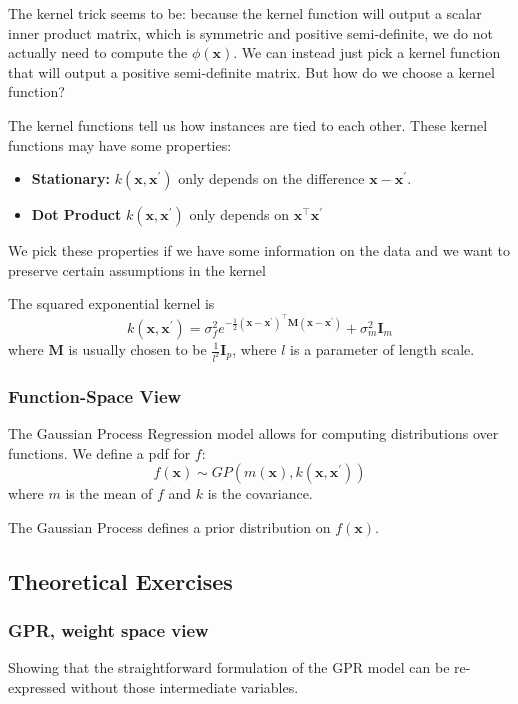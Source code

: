 \documentclass[11pt]{article}
\begin{document}
The kernel trick seems to be: because the kernel function will output a scalar inner product matrix, which is symmetric and positive semi-definite,
we do not actually need to compute the $\phi(\textbf{x})$.
We can instead just pick a kernel function that will output a positive semi-definite matrix.
But how do we choose a kernel function?

The kernel functions tell us how instances are tied to each other.
These kernel functions may have some properties:
\begin{itemize}
  \item \textbf{Stationary:} $k(\textbf{x}, \textbf{x}^\prime)$ only depends on the difference $\textbf{x} - \textbf{x}^\prime$.
  \item \textbf{Dot Product} $k(\textbf{x}, \textbf{x}^\prime)$ only depends on $\textbf{x}^\top \textbf{x}^\prime$
\end{itemize}
We pick these properties if we have some information on the data and we want to preserve certain assumptions in the kernel

The squared exponential kernel is 
\begin{equation}
  k(\textbf{x}, \textbf{x}^\prime) = \sigma_f^2 e^{-\frac{1}{2} (\textbf{x} - \textbf{x}^\prime)^\top \textbf{M} (\textbf{x} - \mathbf{x}^\prime)} + \sigma_m^2 \textbf{I}_m
\end{equation}
where $\textbf{M}$ is usually chosen to be $\frac{1}{l^2} \textbf{I}_p$, where $l$ is a parameter of length scale.

\subsubsection{Function-Space View}
The Gaussian Process Regression model allows for computing distributions over functions.
We define a pdf for $f$:
\begin{equation}
  f(\textbf{x}) \sim GP(m(\textbf{x}), k(\textbf{x}, \textbf{x}^\prime))
\end{equation}
where $m$ is the mean of $f$ and $k$ is the covariance.

The Gaussian Process defines a prior distribution on $f(\mathbf{x})$.

\subsection{Theoretical Exercises}
\subsubsection{GPR, weight space view}
Showing that the straightforward formulation of the GPR model can be re-expressed without those intermediate variables.
\end{document}
